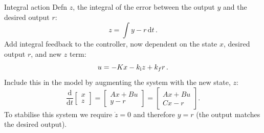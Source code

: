 \documentclass[10pt]{beamer-control}
\begin{document}
\begin{frame}{Integral action}
Defn $z$, the integral of the error between the output $y$ and the desired output $r$:
\begin{equation}
z = \int y-r \,\mathrm{d}t \,.
\end{equation}
Add integral feedback to the controller, now dependent on the state $x$, desired output $r$, and new $z$ term:
\begin{equation}
  u = -K x - k_{\mathrm{i}} z + k_f r \,.
\end{equation}
Include this in the model by augmenting the system with the new state, $z$:
\begin{equation}
  \frac{\mathrm{d}}{\mathrm{d} t} 
\begin{bmatrix}
	x \\ z
\end{bmatrix} = 
\begin{bmatrix}
	Ax+Bu\\ y-r
\end{bmatrix} = \begin{bmatrix}
Ax+Bu\\ Cx-r
\end{bmatrix}.
\end{equation}
To stabilise this system we require $\dot{z}=0$ and therefore $y=r$  (the output matches the desired output).\\
\end{frame}

\end{document}
